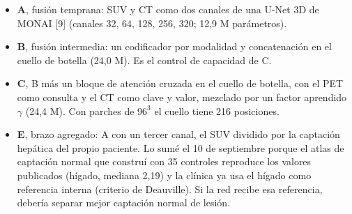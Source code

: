 \documentclass[11pt,a4paper]{article}
\begin{document}
\begin{itemize}
\item \textbf{A}, fusión temprana: SUV y CT como dos canales de una U-Net 3D de MONAI [9] (canales 32, 64, 128, 256, 320; 12,9 M parámetros).
\item \textbf{B}, fusión intermedia: un codificador por modalidad y concatenación en el cuello de botella (24,0 M). Es el control de capacidad de C.
\item \textbf{C}, B más un bloque de atención cruzada en el cuello de botella, con el PET como consulta y el CT como clave y valor, mezclado por un factor aprendido $\gamma$ (24,4 M). Con parches de $96^3$ el cuello tiene 216 posiciones.
\item \textbf{E}, brazo agregado: A con un tercer canal, el SUV dividido por la captación hepática del propio paciente. Lo sumé el 10 de septiembre porque el atlas de captación normal que construí con 35 controles reproduce los valores publicados (hígado, mediana 2,19) y la clínica ya usa el hígado como referencia interna (criterio de Deauville). Si la red recibe esa referencia, debería separar mejor captación normal de lesión.
\end{itemize}
\end{document}

